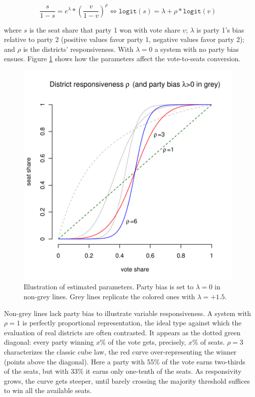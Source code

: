 \documentclass[letter,12pt]{article}
\begin{document}
\begin{equation}
 \frac{s}{1-s} = e^\lambda *  \left(\frac{v}{1-v}\right)^\rho \iff
 \texttt{logit}(s) = \lambda + \rho *  \texttt{logit}(v)
\end{equation}\label{E:cubeLaw}

\noindent where $s$ is the seat share that party 1 won with vote share $v$; $\lambda$ is party 1's bias relative to party 2 (positive values favor party 1, negative values favor party 2); and $\rho$ is the districts' responsiveness. With $\lambda=0$ a system with no party bias ensues. Figure \ref{F:lambdaRhoEx} shows how the parameters affect the vote-to-seats conversion. 


\begin{figure}
\begin{center}
    \includegraphics[width=.55\columnwidth]{rhoExample.pdf} 
\caption{Illustration of estimated parameters. Party bias is set to $\lambda=0$ in non-grey lines. Grey lines replicate the colored ones with $\lambda=+1.5$.}\label{F:lambdaRhoEx}
\end{center}
\end{figure}

Non-grey lines lack party bias to illustrate variable responsiveness. A system with $\rho=1$ is perfectly proportional representation, the ideal type against which the evaluation of real districts are often contrasted. It appears as the dotted green diagonal: every party winning $x$\% of the vote gets, precisely, $x$\% of seats. $\rho=3$ characterizes the classic cube law, the red curve over-representing the winner (points above the diagonal). Here a party with 55\% of the vote earns two-thirds of the seats, but with 33\% it earns only one-tenth of the seats. As responsivity grows, the curve gets steeper, until barely crossing the majority threshold suffices to win all the available seats. 
\end{document}
